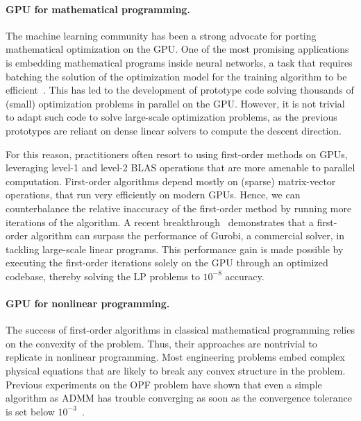 \paragraph{GPU for mathematical programming.}
The machine learning community has been a strong advocate for porting
mathematical optimization on the GPU. One of the most promising
applications is embedding mathematical programs inside neural networks,
a task that requires batching the solution of the optimization model
for the training algorithm to be
efficient~\cite{amos2017optnet,pineda2022theseus}.  This has led to
the development of prototype code solving thousands of (small)
optimization problems in parallel on the GPU.  However, it is not
trivial to adapt such code to solve large-scale optimization problems,
as the previous prototypes are reliant on dense linear solvers to
compute the descent direction.

For this reason, practitioners often resort to using first-order
methods on GPUs, leveraging level-1 and level-2 BLAS operations that
are more amenable to parallel computation.
First-order algorithms depend mostly on (sparse) matrix-vector operations, that run
very efficiently on modern GPUs. Hence, we can counterbalance
the relative inaccuracy of the first-order method by running more
iterations of the algorithm.
A recent breakthrough~\cite{lu2023cupdlp,lu2023cupdlp2} demonstrates
that a first-order algorithm can surpass the performance of Gurobi, a
commercial solver, in tackling large-scale linear programs. This
performance gain is made possible by executing the first-order
iterations solely on the GPU through an optimized codebase, thereby
solving the LP problems to $10^{-8}$ accuracy.


\paragraph{GPU for nonlinear programming.}
The success of first-order algorithms in classical mathematical programming
relies on the convexity of the problem. Thus, their approaches are nontrivial to replicate
in nonlinear programming. Most engineering problems embed complex
physical equations that are likely to break any convex structure in the problem.
Previous experiments on the OPF problem have shown that even a simple
algorithm as ADMM has trouble converging as soon as the convergence
tolerance is set below $10^{-3}$~\cite{kim2021leveraging}.

